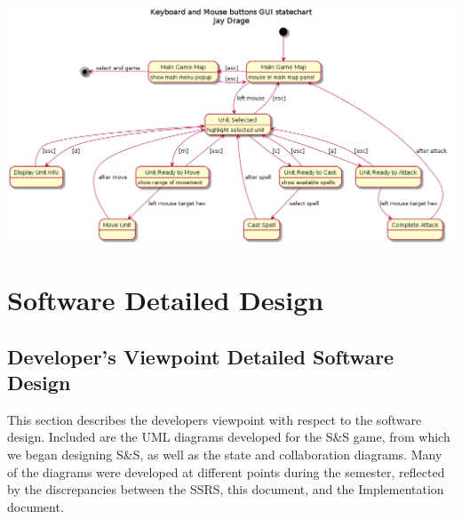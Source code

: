 \documentclass[12pt,a4paper,titlepage]{article}
\begin{document}
\pagebreak
\begin{center}
\includegraphics[width=\linewidth]{KeyMouseButtons.png}
\end{center}
\pagebreak

\section{Software Detailed Design}
\subsection{Developer's Viewpoint Detailed Software Design}
This section describes the developers viewpoint with respect to the software design. Included are the UML diagrams developed for the S\&S game, from which we began designing S\&S, as well as the state and collaboration diagrams. Many of the diagrams were developed at different points during the semester, reflected by the discrepancies between the SSRS, this document, and the Implementation document. 
\end{document}
